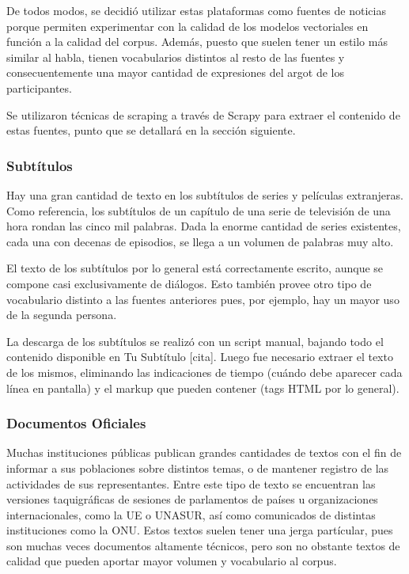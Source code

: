 De todos modos, se decidió utilizar estas plataformas como fuentes de noticias porque permiten
experimentar con la calidad de los modelos vectoriales en función a la calidad del corpus. Además,
puesto que suelen tener un estilo más similar al habla, tienen vocabularios distintos al resto de
las fuentes y consecuentemente una mayor cantidad de expresiones del argot de los participantes.

Se utilizaron técnicas de scraping a través de Scrapy para extraer el contenido de estas fuentes,
punto que se detallará en la sección siguiente.


\subsubsection{Subtítulos}

Hay una gran cantidad de texto en los subtítulos de series y películas extranjeras. Como referencia,
los subtítulos de un capítulo de una serie de televisión de una hora rondan las cinco mil
palabras. Dada la enorme cantidad de series existentes, cada una con decenas de episodios, se llega
a un volumen de palabras muy alto.

El texto de los subtítulos por lo general está correctamente escrito, aunque se compone casi
exclusivamente de diálogos. Esto también provee otro tipo de vocabulario distinto a las fuentes
anteriores pues, por ejemplo, hay un mayor uso de la segunda persona.

La descarga de los subtítulos se realizó con un script manual, bajando todo el contenido disponible
en Tu Subtítulo [cita]. Luego fue necesario extraer el texto de los mismos, eliminando las
indicaciones de tiempo (cuándo debe aparecer cada línea en pantalla) y el markup que pueden contener
(tags HTML por lo general).


\subsubsection{Documentos Oficiales}

Muchas instituciones públicas publican grandes cantidades de textos con el fin de informar a sus
poblaciones sobre distintos temas, o de mantener registro de las actividades de sus
representantes. Entre este tipo de texto se encuentran las versiones taquigráficas de sesiones de
parlamentos de países u organizaciones internacionales, como la UE o UNASUR, así como comunicados de
distintas instituciones como la ONU\@. Estos textos suelen tener una jerga partícular, pues son
muchas veces documentos altamente técnicos, pero son no obstante textos de calidad que pueden
aportar mayor volumen y vocabulario al corpus.

